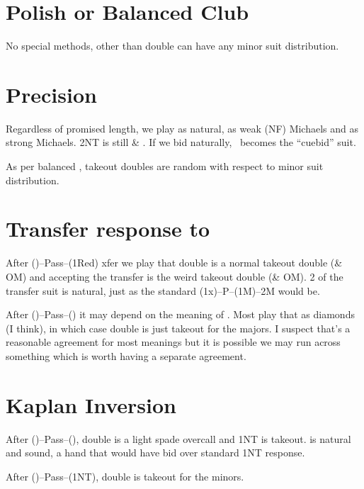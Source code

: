 \documentclass[tom-ari]{subfile}
\begin{document}
	\section{Polish or Balanced Club}
	
	No special methods, other than double can have any minor suit distribution.
	
	
	\section[Precision 1D]{Precision }
	
	Regardless of promised length, we play  as natural,  as weak (NF) Michaels and  as strong Michaels. 2NT is still \heartsuit \& \clubsuit. If we bid  naturally, \clubsuit ~becomes the ``cuebid'' suit.
	
	As per balanced , takeout doubles are random with respect to minor suit distribution.
	
	\section[Transfer response to 1C]{Transfer response to }
	
	After ()--Pass--(1Red) xfer we play that double is a normal takeout double (\diamondsuit \& OM) and accepting the transfer is the weird takeout double (\clubsuit \& OM). 2 of the transfer suit is natural, just as the standard (1x)--P--(1M)--2M would be.
	
	After ()--Pass--() it may depend on the meaning of . Most play that as diamonds (I think), in which case double is just takeout for the majors. I suspect that's a reasonable agreement for most  meanings but it is possible we may run across something which is worth having a separate agreement.
	
	\section{Kaplan Inversion}
	
	After ()--Pass--(), double is a light spade overcall and 1NT is takeout.  is natural and sound, a hand that would have bid  over standard 1NT response.
	
	After ()--Pass--(1NT), double is takeout for the minors.
	
\end{document}
